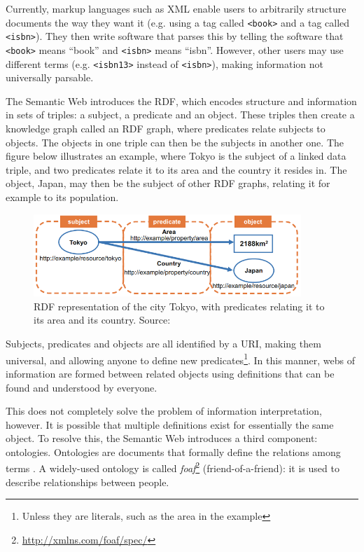 Currently, markup languages such as XML enable users to arbitrarily structure documents the way they want it (e.g. using a tag called \texttt{<book>} and a tag called \texttt{<isbn>}). They then write software that parses this by telling the software that \texttt{<book>} means ``book'' and \texttt{<isbn>} means ``isbn''. However, other users may use different terms (e.g. \texttt{<isbn13>} instead of \texttt{<isbn>}), making information not universally parsable. 

\noindent The Semantic Web introduces the \gls{RDF}, which encodes structure and information in sets of triples: a subject, a predicate and an object. These triples then create a knowledge graph called an RDF graph, where predicates relate subjects to objects. The objects in one triple can then be the subjects in another one. The figure below illustrates an example, where Tokyo is the subject of a linked data triple, and two predicates relate it to its area and the country it resides in. The object, Japan, may then be the subject of other RDF graphs, relating it for example to its population.

\begin{figure}[H]
    \centering
    \includegraphics[width = 0.9\textwidth]{images/background/linked-data.png}
    \caption{\acrshort{RDF} representation of the city Tokyo, with predicates relating it to its area and its country. Source: \citet{generating-pva}}
    \label{fig:linked-data}
\end{figure}

\noindent Subjects, predicates and objects are all identified by a URI, making them universal, and allowing anyone to define new predicates\footnote{Unless they are literals, such as the area in the example}. In this manner, webs of information are formed between related objects using definitions that can be found and understood by everyone.

This does not completely solve the problem of information interpretation, however. It is possible that multiple definitions exist for essentially the same object. To resolve this, the Semantic Web introduces a third component: ontologies. Ontologies are documents that formally define the relations among terms \citep{semantic-web}. A widely-used ontology is called \textit{foaf}\footnote{\url{ http://xmlns.com/foaf/spec/}} (friend-of-a-friend): it is used to describe relationships between people.


